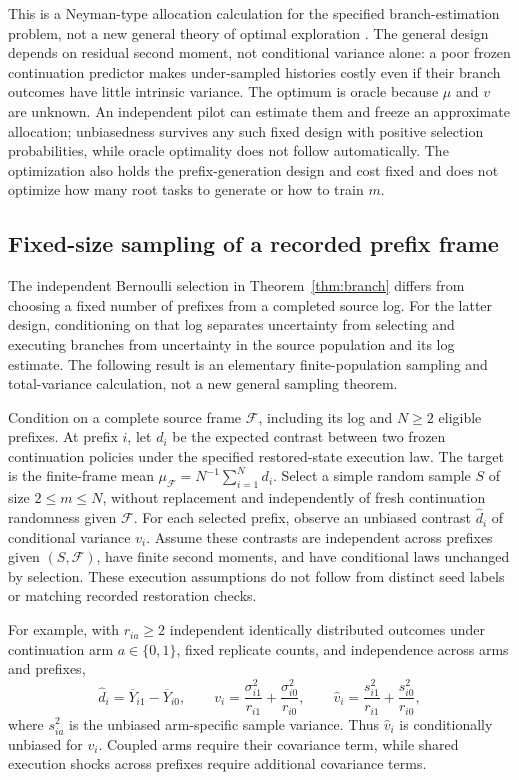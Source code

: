 This is a Neyman-type allocation calculation for the specified branch-estimation problem, not a new general theory of optimal exploration \citep{neyman1934representative,li2023allocation}. The general design depends on residual second moment, not conditional variance alone: a poor frozen continuation predictor makes under-sampled histories costly even if their branch outcomes have little intrinsic variance. The optimum is oracle because $\mu$ and $v$ are unknown. An independent pilot can estimate them and freeze an approximate allocation; unbiasedness survives any such fixed design with positive selection probabilities, while oracle optimality does not follow automatically. The optimization also holds the prefix-generation design and cost fixed and does not optimize how many root tasks to generate or how to train $m$.

\subsection{Fixed-size sampling of a recorded prefix frame}
\label{sec:fixed-frame-branches}

The independent Bernoulli selection in Theorem~\ref{thm:branch} differs from choosing a fixed number of prefixes from a completed source log. For the latter design, conditioning on that log separates uncertainty from selecting and executing branches from uncertainty in the source population and its log estimate. The following result is an elementary finite-population sampling and total-variance calculation, not a new general sampling theorem.

Condition on a complete source frame $\mathcal F$, including its log and $N\ge2$ eligible prefixes. At prefix $i$, let $d_i$ be the expected contrast between two frozen continuation policies under the specified restored-state execution law. The target is the finite-frame mean $\mu_{\mathcal F}=N^{-1}\sum_{i=1}^N d_i$. Select a simple random sample $S$ of size $2\le m\le N$, without replacement and independently of fresh continuation randomness given $\mathcal F$. For each selected prefix, observe an unbiased contrast $\widehat d_i$ of conditional variance $v_i$. Assume these contrasts are independent across prefixes given $(S,\mathcal F)$, have finite second moments, and have conditional laws unchanged by selection. These execution assumptions do not follow from distinct seed labels or matching recorded restoration checks.

For example, with $r_{ia}\ge2$ independent identically distributed outcomes under continuation arm $a\in\{0,1\}$, fixed replicate counts, and independence across arms and prefixes,
\begin{equation}
 \widehat d_i=\overline Y_{i1}-\overline Y_{i0},\qquad
 v_i=\frac{\sigma_{i1}^2}{r_{i1}}+\frac{\sigma_{i0}^2}{r_{i0}},\qquad
 \widehat v_i=\frac{s_{i1}^2}{r_{i1}}+\frac{s_{i0}^2}{r_{i0}},
 \label{eq:frame-replicates}
\end{equation}
where $s_{ia}^2$ is the unbiased arm-specific sample variance. Thus $\widehat v_i$ is conditionally unbiased for $v_i$. Coupled arms require their covariance term, while shared execution shocks across prefixes require additional covariance terms.

